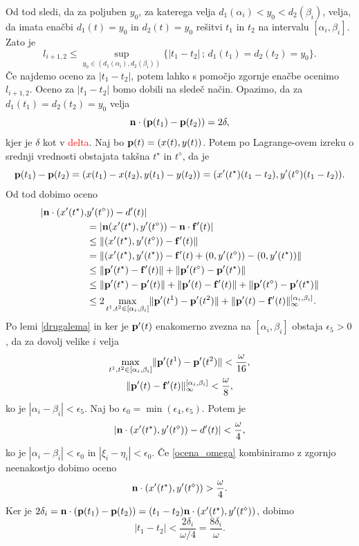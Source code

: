 Od tod sledi, da za poljuben $y_0$, za katerega velja $d_1(\alpha _i) < y_0 < d_2(\beta _i)$, velja, da imata enačbi $d_1(t)=y_0$ in $d_2(t) = y_0$ rešitvi $t_1$ in $t_2$ na intervalu $[\alpha _i, \beta _i]$. Zato je
$$
l_{i+1, 2} \leq \sup _{y_0\in (d_1(\alpha _i), d_2(\beta _i))} \{ |t_1-t_2|\, ; \, d_1(t_1)=d_2(t_2)=y_0\}.
$$
Če najdemo oceno za $|t_1-t_2|$, potem lahko s pomočjo zgornje enačbe ocenimo $l_{i+1,2}$. Oceno za $|t_1-t_2|$ bomo dobili na sledeč način. 
Opazimo, da za $d_1(t_1) = d_2(t_2) = y_0$ velja
$$
{\bf n}\cdot ({\bf p} (t_1) - {\bf p}(t_2)) = 2\delta,
$$
kjer je $\delta$ kot v \textcolor{red}{delta}. Naj bo ${\bf p}(t)=(x(t),y(t))$. Potem po Lagrange-ovem izreku o srednji vrednosti obstajata takšna $t^{\star}$ in $t^{\diamond}$, da je
$$
{\bf p}(t_1) - {\bf p}(t_2) = (x(t_1) - x(t_2), y(t_1) - y(t_2)) = (x'(t^{\star})(t_1-t_2),y'(t^{\diamond})(t_1-t_2)).
$$
Od tod dobimo oceno
\begin{equation*}
\begin{split}
|{\bf n}\cdot(x'(t^{\star}), &y'(t^\diamond)) - d'(t)|  \\
& = |{\bf n} (x'(t^\star), y'(t^\diamond)) - {\bf n}\cdot {\bf f}'(t) | \\
& \leq \lVert (x'(t^\star), y'(t^\diamond)) - {\bf f}'(t)\rVert \\
& = \lVert (x'(t^\star),y'(t^\star)) - {\bf f}'(t) + (0, y'(t^\diamond)) - (0,y'(t^\star))\rVert \\
& \leq \lVert {\bf p}'(t^\star) - {\bf f}'(t)\rVert + \lVert {\bf p}'(t^\diamond) - {\bf p}'(t^\star)\rVert \\ 
& \leq \lVert {\bf p}'(t^\star) - {\bf p}'(t)\rVert + \lVert {\bf p}'(t) - {\bf f}'(t)\rVert + 
\lVert {\bf p}'(t^\diamond) - {\bf p}'(t^\star)\rVert \\
& \leq 2\max _{t^1,t^2\in [\alpha _i,\beta _i]} \lVert {\bf p}'(t^1) - {\bf p}'(t^2)\rVert + 
\lVert {\bf p}'(t) - {\bf f}'(t)\rVert _{\infty}^{[\alpha _i,\beta _i]}.
\end{split}
\end{equation*}
Po lemi \ref{drugalema} in ker je ${\bf p'}(t)$ enakomerno zvezna na $[\alpha _i,\beta _i]$ obstaja $\epsilon _5 > 0$, da za dovolj velike $i$ velja 
\begin{gather*}
\max _{t^1,t^2\in [\alpha _i,\beta _i]} \lVert {\bf p}'(t^1) - {\bf p}'(t^2)\rVert < \frac{\omega}{16},\\
\lVert {\bf p}'(t) - {\bf f}'(t)\rVert _{\infty}^{[\alpha _i,\beta _i]} < \frac{\omega}{8},
\end{gather*}
ko je $|\alpha _i - \beta _i| < \epsilon _5$. Naj bo $\epsilon _0 = \min (\epsilon _4, \epsilon _5)$. Potem je 
$$
|{\bf n}\cdot (x'(t^\star), y'(t^\diamond)) - d'(t)| < \frac{\omega}{4},
$$
ko je $|\alpha _i - \beta _i| < \epsilon _0$ in $|\xi _i - \eta _i| < \epsilon _0$.
Če \ref{ocena_omega} kombiniramo z zgornjo neenakostjo dobimo oceno
$$
{\bf n}\cdot (x'(t^\star), y'(t^\diamond)) > \frac{\omega}{4}.
$$
Ker je $2\delta _i = {\bf n}\cdot({\bf p}(t_1) - {\bf p}(t_2)) = (t_1-t_2){\bf n}\cdot(x'(t^\star),y'(t^\diamond))$, dobimo
$$
|t_1-t_2| < \frac{2\delta _i}{\omega /4 } = \frac{8\delta _i}{\omega}.
$$


